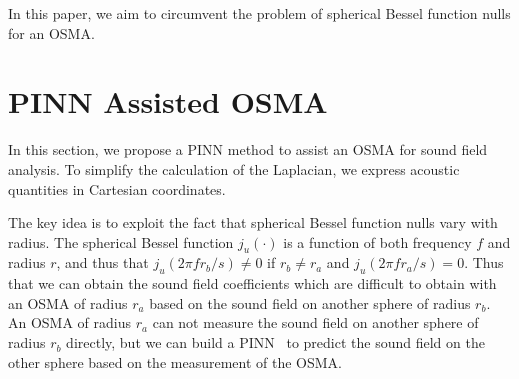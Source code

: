\documentclass[11pt]{article}
\begin{document}
In this paper, %
we aim to circumvent the problem of spherical 
Bessel function nulls for an OSMA. 
\section{PINN Assisted OSMA}
In this section, we propose a PINN method to assist an OSMA for sound field analysis.
To simplify the calculation of the Laplacian,   we express acoustic quantities in 
Cartesian coordinates. 

The key idea is to exploit the fact that spherical Bessel function nulls vary with 
radius. 
The spherical Bessel function $j_u(\cdot)$ is a function of both frequency $f$ and 
radius $r$, and thus that $j_u(2\pi{f}r_b/s)\neq0$ if $r_b{}\neq{}r_a$ 
and $j_u(2\pi{f}r_a/s)=0$.  
Thus that we can obtain the  sound field coefficients which are difficult 
to obtain with  an OSMA of radius $r_a$ 
based on the sound field on another sphere of radius $r_b$.
An OSMA of radius $r_a$ can not  measure the sound field on 
another sphere of radius $r_b$ directly, but we can build a 
PINN~\cite{raissi2019physics,cuomo2022scientific,karniadakis2021physics} to 
predict the sound  field on the other sphere based on the measurement of the OSMA.
\end{document}
